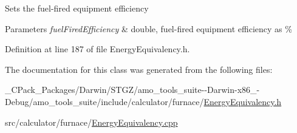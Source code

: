 Sets the fuel-\/fired equipment efficiency


\begin{DoxyParams}{Parameters}
{\em fuel\+Fired\+Efficiency} & double, fuel-\/fired equipment efficiency as \% \\
\hline
\end{DoxyParams}


Definition at line 187 of file Energy\+Equivalency.\+h.



The documentation for this class was generated from the following files\+:\begin{DoxyCompactItemize}
\item 
\+\_\+\+C\+Pack\+\_\+\+Packages/\+Darwin/\+S\+T\+G\+Z/amo\+\_\+tools\+\_\+suite-\/-\/\+Darwin-\/x86\+\_-\/\+Debug/amo\+\_\+tools\+\_\+suite/include/calculator/furnace/\hyperlink{___c_pack___packages_2_darwin_2_s_t_g_z_2amo__tools__suite--_darwin-x86__64-_debug_2amo__tools__46d4d8156642b7bcd4be7fa8e6d162d8}{Energy\+Equivalency.\+h}\item 
src/calculator/furnace/\hyperlink{_energy_equivalency_8cpp}{Energy\+Equivalency.\+cpp}\end{DoxyCompactItemize}

